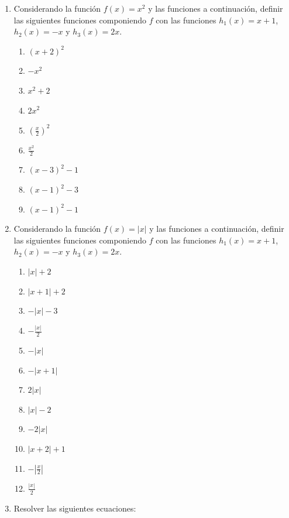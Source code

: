 \documentclass[a4paper]{article}
\newcommand{\exercise}{\item}
\begin{document}
\begin{enumerate}
\begin{enumerate} [label=(\alph*)]
		\item $f(x)=x^2+2x$, $g(x)=\displaystyle\frac{x}{4}$ y $h(x)=x+12$.
	\end{enumerate}
	\exercise Considerando la función $f(x)=x^2$ y las funciones a continuación, definir las siguientes funciones componiendo $f$ con las funciones $h_1(x)=x+1$, $h_2(x)=-x$ y $h_3(x)=2x$.
	\begin{multicols}{3}
	\begin{enumerate} [label=(\alph*)]
		\item $(x+2)^2$
		\item $-x^2$
		\item $x^2+2$
		\item $2x^2$
		\item $\left(\displaystyle\frac{x}{2}\right)^2$
		\item $\displaystyle\frac{x^2}{2}$
		\item $(x-3)^2-1$
		\item $(x-1)^2-3$
		\item $(x-1)^2-1$
	\end{enumerate}
	\end{multicols}
	\exercise Considerando la función $f(x)=|x|$ y las funciones a continuación, definir las siguientes funciones componiendo $f$ con las funciones $h_1(x)=x+1$, $h_2(x)=-x$ y $h_3(x)=2x$.
	\begin{multicols}{3}
	\begin{enumerate} [label=(\alph*)]
		\item $|x|+2$
		\item $|x+1|+2$
		\item $-|x|-3$
		\item $-\displaystyle\frac{|x|}{2}$
		\item $-|x|$
		\item $-|x+1|$
		\item $2|x|$
		\item $|x|-2$
		\item $-2|x|$
		\item $|x+2|+1$
		\item $-\left|\displaystyle\frac{x}{2}\right|$
		\item $\displaystyle\frac{|x|}{2}$
	\end{enumerate}
	\end{multicols}
	\exercise Resolver las siguientes ecuaciones:
	\begin{enumerate} [label=(\alph*)]

\end{enumerate}
\end{enumerate}
\end{document}
